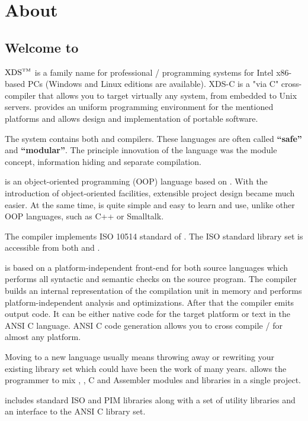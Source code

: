 \chapter{About \XDS}

\section{Welcome to \XDS}

\ifonline \xds{}\else $\mbox{XDS}^{\mbox{\tiny TM}}$\fi{} is a family name
for professional \mt{}/\ot{} programming systems for 
Intel x86-based PCs (Windows and Linux editions are available).
\ifgenc XDS-C is a "via C" cross-compiler that allows you
to target virtually any system, from embedded to Unix servers.
\fi
\xds{} provides an
uniform programming environment for the mentioned
platforms and allows design and implementation of portable software.

The system contains both \mt{} and \ot{} compilers. These
languages are often called {\bf ``safe''} and {\bf ``modular''}. The
principle innovation of the language \mt{} was the module concept,
information hiding and separate compilation.

\ot{} is an object-oriented programming (OOP) language based on
\mt. With the introduction of object-oriented facilities,
extensible project design became much easier. At the same time, \ot{} is
quite simple and easy to learn and use, unlike other OOP
languages, such as C++ or Smalltalk.

The \xds{} \mt{} compiler implements ISO 10514 standard of \mt{}.
The ISO standard library set is accessible from both \mt{} and \ot{}.

\xds{} is based on a platform-independent front-end for both source
languages which performs all syntactic and semantic checks on the
source program. The compiler builds an internal representation of
the compilation unit in memory and performs platform-independent
analysis and optimizations. After that the compiler emits output
code. It can be either native code for the target platform or
text in the ANSI C language. ANSI C code generation allows you to
cross compile \mt{}/\ot{} for almost any platform. 

Moving to a new language usually means throwing away or rewriting
your existing library set which could have been the work of many
years. \xds{} allows the programmer to mix \mt{}, \ot{}, C and
Assembler modules and libraries in a single project.

\xds{} includes standard ISO and PIM libraries along with a set
of utility libraries and an interface to the ANSI C library set.

